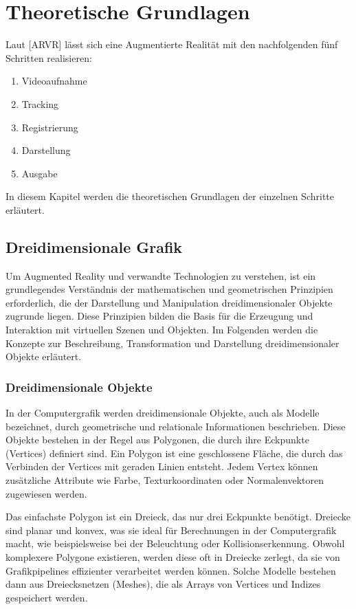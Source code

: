 \chapter{Theoretische Grundlagen}

Laut [ARVR] lässt sich eine Augmentierte Realität mit den nachfolgenden fünf Schritten realisieren:

\begin{enumerate}
    \item Videoaufnahme
    \item Tracking
    \item Registrierung
    \item Darstellung
    \item Ausgabe
\end{enumerate}

In diesem Kapitel werden die theoretischen Grundlagen der einzelnen Schritte erläutert. 

\section{Dreidimensionale Grafik}

Um Augmented Reality und verwandte Technologien zu verstehen, ist ein grundlegendes Verständnis der mathematischen und geometrischen Prinzipien erforderlich, die der Darstellung und Manipulation dreidimensionaler Objekte zugrunde liegen. Diese Prinzipien bilden die Basis für die Erzeugung und Interaktion mit virtuellen Szenen und Objekten. Im Folgenden werden die Konzepte zur Beschreibung, Transformation und Darstellung dreidimensionaler Objekte erläutert.

\subsection{Dreidimensionale Objekte}

In der Computergrafik werden dreidimensionale Objekte, auch als Modelle bezeichnet, durch geometrische und relationale Informationen beschrieben. Diese Objekte bestehen in der Regel aus Polygonen, die durch ihre Eckpunkte (Vertices) definiert sind. Ein Polygon ist eine geschlossene Fläche, die durch das Verbinden der Vertices mit geraden Linien entsteht. Jedem Vertex können zusätzliche Attribute wie Farbe, Texturkoordinaten oder Normalenvektoren zugewiesen werden.

Das einfachste Polygon ist ein Dreieck, das nur drei Eckpunkte benötigt. Dreiecke sind planar und konvex, was sie ideal für Berechnungen in der Computergrafik macht, wie beispielsweise bei der Beleuchtung oder Kollisionserkennung. Obwohl komplexere Polygone existieren, werden diese oft in Dreiecke zerlegt, da sie von Grafikpipelines effizienter verarbeitet werden können. Solche Modelle bestehen dann aus Dreiecksnetzen (Meshes), die als Arrays von Vertices und Indizes gespeichert werden.

